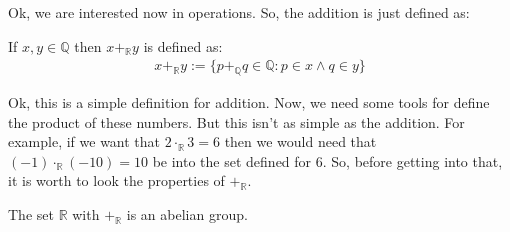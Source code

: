 \documentclass{tufte-handout}
\begin{document}
Ok, we are interested now in operations. So, the addition is just defined as:
\begin{definition}
	If $x, y \in \mathbb{Q}$ then $x +_\mathbb{R} y$ is defined as:
	\begin{align*}
		x +_\mathbb{R} y := \{p +_\mathbb{Q} q \in \mathbb{Q}: p \in x \wedge q \in y \}
	\end{align*}
\end{definition}

Ok, this is a simple definition for addition. Now, we need some tools for define the product of these numbers. But this isn't as simple as the addition. For example, if we want that $2 \cdot_\mathbb{R} 3 = 6$ then we would need that $(-1) \cdot_\mathbb{R} (-10) = 10$ be into the set defined for $6$. So, before getting into that, it is worth to look the properties of $+_\mathbb{R}$.
\begin{theorem}
	The set $\mathbb{R}$ with $+_\mathbb{R}$ is an abelian group.
\end{theorem} 
\end{document}
